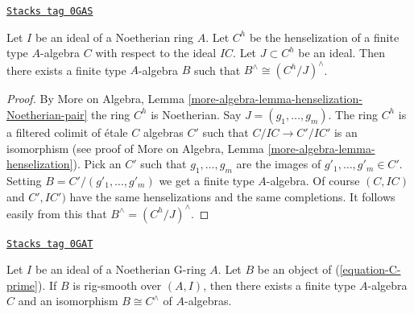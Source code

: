 \begin{lemma}
\label{restricted-lemma-algebraize-easy}
\href{https://stacks.math.columbia.edu/tag/0GAS}{\texttt{Stacks tag 0GAS}}

Let $I$ be an ideal of a Noetherian ring $A$. Let $C^h$ be the henselization
of a finite type $A$-algebra $C$ with respect to the ideal $IC$. Let
$J \subset C^h$ be an ideal. Then there exists a finite type $A$-algebra
$B$ such that $B^\wedge \cong (C^h/J)^\wedge$.
\end{lemma}

\begin{proof}
By More on Algebra, Lemma
\ref{more-algebra-lemma-henselization-Noetherian-pair}
the ring $C^h$ is Noetherian. Say $J = (g_1, \ldots, g_m)$.
The ring $C^h$ is a filtered colimit of \'etale $C$ algebras $C'$
such that $C/IC \to C'/IC'$ is an isomorphism
(see proof of More on Algebra, Lemma \ref{more-algebra-lemma-henselization}).
Pick an $C'$ such that $g_1, \ldots, g_m$ are the
images of $g'_1, \ldots, g'_m \in C'$.
Setting $B = C'/(g'_1, \ldots, g'_m)$ we get a finite
type $A$-algebra. Of course $(C, IC)$ and $C', IC')$ have
the same henselizations and the same completions.
It follows easily from this that $B^\wedge = (C^h/J)^\wedge$.
\end{proof}

\begin{proposition}[Approximate]
\label{restricted-proposition-approximate}
\href{https://stacks.math.columbia.edu/tag/0GAT}{\texttt{Stacks tag 0GAT}}

Let $I$ be an ideal of a Noetherian G-ring $A$. Let $B$ be an
object of (\ref{equation-C-prime}). If $B$ is rig-smooth
over $(A, I)$, then there exists a finite type $A$-algebra
$C$ and an isomorphism $B \cong C^\wedge$ of $A$-algebras.
\end{proposition}

